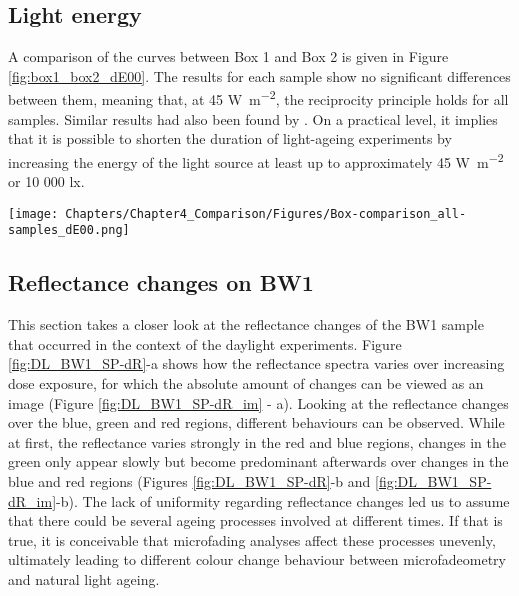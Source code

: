 \subsection{Light energy}

A comparison of the \dEOO curves between Box 1 and Box 2 is given in Figure \ref{fig:box1_box2_dE00}. The results for each sample show no significant differences between them, meaning that, at 45 \unit{\watt\per\square\metre}, the reciprocity principle holds for all samples. Similar results had also been found by \citet{saunders_light-induced_1996}. On a practical level, it implies that it is possible to shorten the duration of light-ageing experiments by increasing the energy of the light source at least up to approximately 45 \unit{\watt\per\square\metre} or 10 000 \unit{\lux}. \\

\begin{figure*}[!h]
\centering
\texttt{[image: Chapters/Chapter4\_Comparison/Figures/Box-comparison\_all-samples\_dE00.png]}
\caption[\hspace{0.3cm}\dEOO curves for Box 1 and Box 2]{\dEOO curves for Box 1 and Box 2.}
\label{fig:box1_box2_dE00}
\end{figure*}


\subsection{Reflectance changes on BW1}
\label{sec:RS_BW1}


This section takes a closer look at the reflectance changes of the BW1 sample that occurred in the context of the daylight experiments. Figure \ref{fig:DL_BW1_SP-dR}-a shows how the reflectance spectra varies over increasing dose exposure, for which the absolute amount of changes can be viewed as an image (Figure \ref{fig:DL_BW1_SP-dR_im} - a). Looking at the reflectance changes over the blue, green and red regions, different behaviours can be observed. While at first, the reflectance varies strongly in the red and blue regions, changes in the green only appear slowly but become predominant afterwards over changes in the blue and red regions (Figures \ref{fig:DL_BW1_SP-dR}-b and \ref{fig:DL_BW1_SP-dR_im}-b). The lack of uniformity regarding reflectance changes led us to assume that there could be several ageing processes involved at different times. If that is true, it is conceivable that microfading analyses affect these processes unevenly, ultimately leading to different colour change behaviour between microfadeometry and natural light ageing. \\

